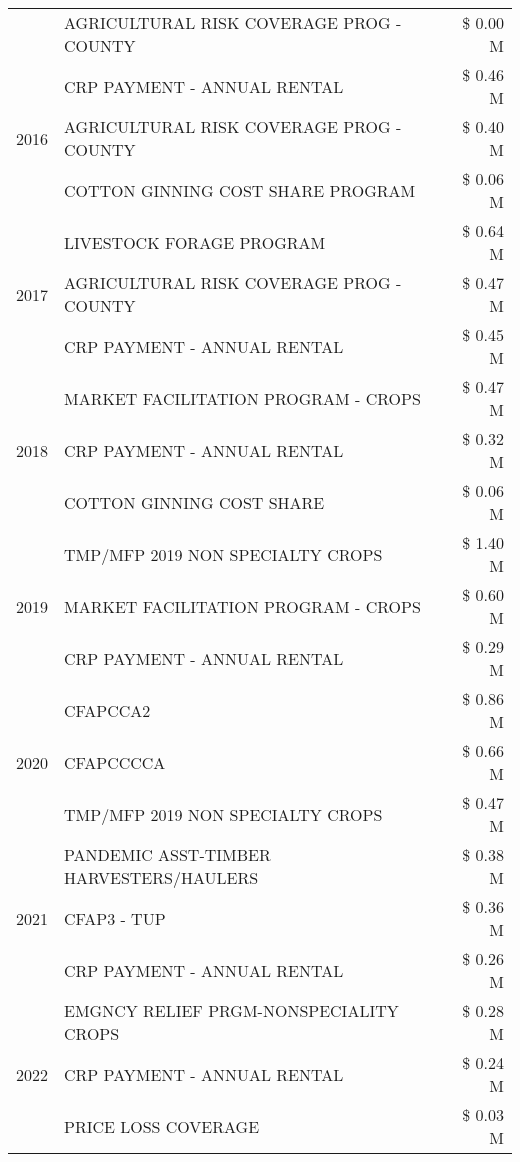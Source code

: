 \begin{tabular}{llr}
 & AGRICULTURAL RISK COVERAGE PROG - COUNTY & \$ 0.00 M \\
\cline{1-3}
\multirow[t]{3}{*}{2016} & CRP PAYMENT - ANNUAL RENTAL & \$ 0.46 M \\
 & AGRICULTURAL RISK COVERAGE PROG - COUNTY & \$ 0.40 M \\
 & COTTON GINNING COST SHARE PROGRAM & \$ 0.06 M \\
\cline{1-3}
\multirow[t]{3}{*}{2017} & LIVESTOCK FORAGE PROGRAM & \$ 0.64 M \\
 & AGRICULTURAL RISK COVERAGE PROG - COUNTY & \$ 0.47 M \\
 & CRP PAYMENT - ANNUAL RENTAL & \$ 0.45 M \\
\cline{1-3}
\multirow[t]{3}{*}{2018} & MARKET FACILITATION PROGRAM - CROPS & \$ 0.47 M \\
 & CRP PAYMENT - ANNUAL RENTAL & \$ 0.32 M \\
 & COTTON GINNING COST SHARE & \$ 0.06 M \\
\cline{1-3}
\multirow[t]{3}{*}{2019} & TMP/MFP 2019 NON SPECIALTY CROPS & \$ 1.40 M \\
 & MARKET FACILITATION PROGRAM - CROPS & \$ 0.60 M \\
 & CRP PAYMENT - ANNUAL RENTAL & \$ 0.29 M \\
\cline{1-3}
\multirow[t]{3}{*}{2020} & CFAPCCA2 & \$ 0.86 M \\
 & CFAPCCCCA & \$ 0.66 M \\
 & TMP/MFP 2019 NON SPECIALTY CROPS & \$ 0.47 M \\
\cline{1-3}
\multirow[t]{3}{*}{2021} & PANDEMIC ASST-TIMBER HARVESTERS/HAULERS & \$ 0.38 M \\
 & CFAP3 - TUP & \$ 0.36 M \\
 & CRP PAYMENT - ANNUAL RENTAL & \$ 0.26 M \\
\cline{1-3}
\multirow[t]{3}{*}{2022} & EMGNCY RELIEF PRGM-NONSPECIALITY CROPS & \$ 0.28 M \\
 & CRP PAYMENT - ANNUAL RENTAL & \$ 0.24 M \\
 & PRICE LOSS COVERAGE & \$ 0.03 M \\
\cline{1-3}
\bottomrule
\end{tabular}
